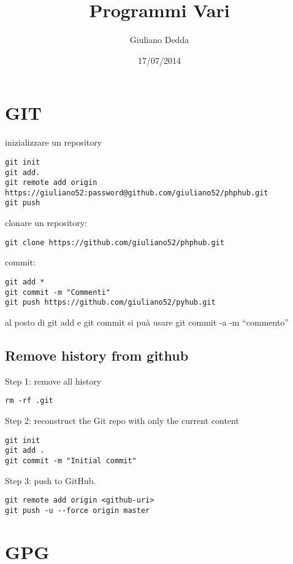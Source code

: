 \documentclass[]{article}
\title{Programmi Vari}
\author{Giuliano Dedda}
\date{17/07/2014}
\begin{document}
\maketitle

\section{GIT}\label{git}

inizializzare un repository

\begin{verbatim}
git init
git add.
git remote add origin  https://giuliano52:password@github.com/giuliano52/phphub.git
git push
\end{verbatim}

clonare un repository:

\begin{verbatim}
git clone https://github.com/giuliano52/phphub.git
\end{verbatim}

commit:

\begin{verbatim}
git add *
git commit -m "Commenti"
git push https://github.com/giuliano52/pyhub.git
\end{verbatim}

al posto di git add e git commit si puà usare git commit -a -m
``commento''

\subsection{Remove history from
github}\label{remove-history-from-github}

Step 1: remove all history

\begin{verbatim}
rm -rf .git
\end{verbatim}

Step 2: reconstruct the Git repo with only the current content

\begin{verbatim}
git init
git add .
git commit -m "Initial commit"
\end{verbatim}

Step 3: push to GitHub.

\begin{verbatim}
git remote add origin <github-uri>
git push -u --force origin master
\end{verbatim}

\section{GPG}\label{gpg}
\end{document}
